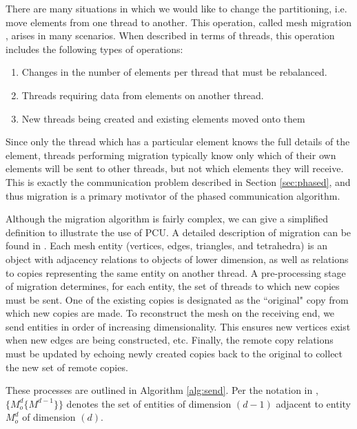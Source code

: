 \documentclass[final,1p,times]{elsarticle}
\begin{document}
There are many situations in which we would like to change the partitioning,
i.e. move elements from one thread to another.
This operation, called mesh migration \cite{seol06,shephard2010flexible,Zhou-ewc}, 
arises in many scenarios. When described in terms of threads, this 
operation includes the following types of operations:
\begin{enumerate}
\item Changes in the number of elements per thread that must be
rebalanced.
\item Threads requiring data from elements on another thread. 
\item New threads being created and existing elements moved onto them
\end{enumerate}
Since only the thread which has a particular element knows the full details of
the element, threads performing migration
typically know only which of their own elements will be sent to other threads,
but not which elements they will receive.
This is exactly the communication problem described in Section \ref{sec:phased},
and thus migration is a primary motivator of the phased communication
algorithm.

Although the migration algorithm is fairly complex, we can give a simplified
definition to illustrate the use of PCU.
A detailed description of migration can be found in \cite{seol06,shephard2010flexible}.
Each mesh entity (vertices, edges, triangles, and tetrahedra) is an object with
adjacency relations to objects of lower dimension, as well as relations
to copies representing the same entity on another thread.
A pre-processing stage of migration determines, for each entity, the set of
threads to which new copies must be sent.
One of the existing copies is designated as the ``original" copy from which
new copies are made.
To reconstruct the mesh on the receiving end, we send entities in order of
increasing dimensionality.
This ensures new vertices exist when new edges are being constructed, etc.
Finally, the remote copy relations must be updated by echoing newly
created copies back to the original to collect the new set of remote copies.

These processes are outlined in Algorithm \ref{alg:send}.
Per the notation in \cite{shephard2010flexible}, $\{M_o^d\{M^{d-1}\}\}$ denotes
the set of entities of dimension $(d-1)$ adjacent to entity $M_o^d$ of dimension $(d)$.
\end{document}
